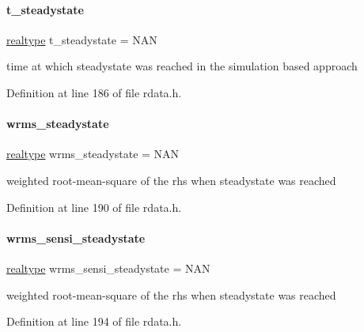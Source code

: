 \paragraph{\texorpdfstring{t\+\_\+steadystate}{t\_steadystate}}
{\footnotesize\ttfamily \mbox{\hyperlink{namespaceamici_a1bdce28051d6a53868f7ccbf5f2c14a3}{realtype}} t\+\_\+steadystate = N\+AN}

time at which steadystate was reached in the simulation based approach 

Definition at line 186 of file rdata.\+h.

\mbox{\label{classamici_1_1_return_data_ad044a0dd6c510ee74c8122767c25d6cb}} 
\paragraph{\texorpdfstring{wrms\+\_\+steadystate}{wrms\_steadystate}}
{\footnotesize\ttfamily \mbox{\hyperlink{namespaceamici_a1bdce28051d6a53868f7ccbf5f2c14a3}{realtype}} wrms\+\_\+steadystate = N\+AN}

weighted root-\/mean-\/square of the rhs when steadystate was reached 

Definition at line 190 of file rdata.\+h.

\mbox{\label{classamici_1_1_return_data_ae10f7eece540838884f18b379083fc8f}} 
\paragraph{\texorpdfstring{wrms\+\_\+sensi\+\_\+steadystate}{wrms\_sensi\_steadystate}}
{\footnotesize\ttfamily \mbox{\hyperlink{namespaceamici_a1bdce28051d6a53868f7ccbf5f2c14a3}{realtype}} wrms\+\_\+sensi\+\_\+steadystate = N\+AN}

weighted root-\/mean-\/square of the rhs when steadystate was reached 

Definition at line 194 of file rdata.\+h.

\mbox{\label{classamici_1_1_return_data_a9089beccffa9671a052e3065166dce53}} 
